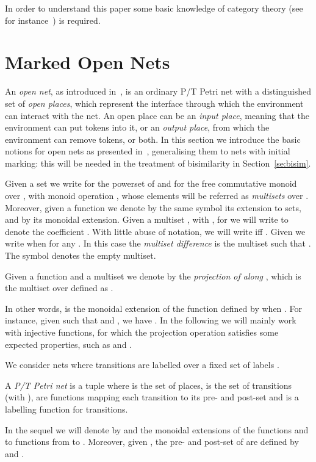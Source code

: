 \documentclass{LMCS}
\begin{document}
In order to understand this paper some basic knowledge of category theory
(see for instance~\cite{p:basic-category-theory}) is required.



\section{Marked Open Nets}
\label{se:open-nets}

An \emph{open net}, as introduced in~\cite{BCEH:CMRS,BCEH:CSOP}, is an
ordinary P/T Petri net with a distinguished set of 
\emph{open places}, which represent the interface through which the
environment can interact with the net. 
An open place can be an \emph{input place}, meaning that the
environment can put tokens into it, or an \emph{output place}, 
from which the environment can remove tokens, or both. 
In this section we introduce the basic notions for open nets as
presented in~\cite{BCEH:CSOP}, generalising them to nets with initial
marking:  this will be needed in the treatment of bisimilarity in
Section~\ref{se:bisim}.  

Given a set  we write  for the powerset of  and
 for the free commutative monoid over , with monoid
operation , whose elements will be referred as
\emph{multisets} over .  Moreover, given a function 
we denote by the same symbol 
its extension to sets, and by  its
monoidal extension.
Given a multiset , with , for  we will write  to denote the coefficient
. With little abuse of notation, we will write 
iff . Given  we write  when  for any . In this case the \emph{multiset difference}
 is the multiset  such that . 
The symbol  denotes the empty multiset.



\begin{defi}
  \label{de:multiset-proj}
  Given a function  and a multiset  we
  denote by  the \emph{projection of  along
    }, which is the multiset over  defined as .
\end{defi}
In other words,  is the monoidal
extension of the function  defined by
 when .
For instance, given 
such that  and , we have .
In the following we
will mainly work with injective
functions, for which the projection operation satisfies some expected
properties, such as  and
.

We consider nets where transitions are labelled over a fixed set of
labels .

\begin{defi}
  A \emph{P/T Petri net} is a tuple 
  where  is the set of places,  is the set of transitions (with
  ),  are functions
  mapping each transition to its pre- and post-set and  is a labelling function for transitions.
\end{defi}
In the sequel we will denote by  and  the monoidal
extensions of the functions  and  to functions from
 to .
Moreover, given , the pre- and post-set of  are
defined by  and .
\end{document}
